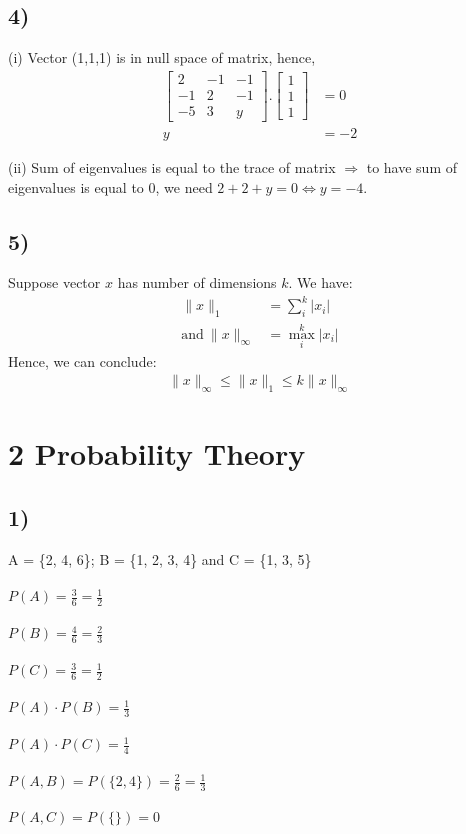\documentclass{article}
\begin{document}
\subsection*{4)}
(i) Vector (1,1,1) is in null space of matrix, hence,
\begin{align*}
\begin{bmatrix}
2 & -1 & -1\\
-1 & 2 & -1\\
-5 & 3 & y
\end{bmatrix}.
\begin{bmatrix} 1\\1\\1\end{bmatrix} &= 0\\
y &= -2
\end{align*}

(ii) Sum of eigenvalues is equal to the trace of matrix $\Rightarrow$ to have sum of eigenvalues is equal to 0, we need $2 + 2 + y = 0 \iff y = -4$.
\subsection*{5)}
Suppose vector $x$ has number of dimensions $k$. We have:
\begin{align*}
\|x\|_1 &= \sum\limits_{i}^{k}|x_{i}|\\
\text{and}\ \|x\|_{\infty} &= \max\limits_{i}^{k}|x_{i}|
\end{align*}
Hence, we can conclude:
\begin{align*}
\|x\|_{\infty} \leq \|x\|_1 \leq k\|x\|_{\infty}
\end{align*}
\section*{2 Probability Theory}
\subsection*{1)}
A = \{2, 4, 6\}; B = \{1, 2, 3, 4\} and C = \{1, 3, 5\}\\\\
$P(A) = \frac{3}{6} = \frac{1}{2}$\\\\
$P(B) = \frac{4}{6} = \frac{2}{3}$\\\\
$P(C) = \frac{3}{6} = \frac{1}{2}$\\\\
$P(A) \cdot P(B) = \frac{1}{3}$\\\\
$P(A) \cdot P(C) = \frac{1}{4}$\\\\
$P(A,B) = P(\{2,4\}) = \frac{2}{6} = \frac{1}{3}$\\\\
$P(A,C) = P(\{\}) = 0$\\
\end{document}
